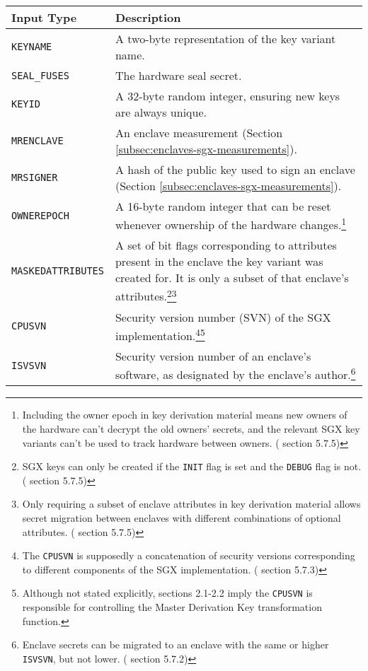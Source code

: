 \begin{tabularx}{\textwidth}{|l|X|}
\caption{Key Derivation Material}
\label{table:sgx-key-derivation-material}\\
\hline
    Input Type & Description \\
\hline\hline
    {\tt KEYNAME} & A two-byte representation of the key variant name. \\
\hline
    {\tt SEAL\_FUSES} & The hardware seal secret. \\
\hline
    {\tt KEYID} & A 32-byte random integer, ensuring new keys are always unique. \\
\hline
    {\tt MRENCLAVE} & An enclave measurement (Section \ref{subsec:enclaves-sgx-measurements}). \\
\hline
    {\tt MRSIGNER} & A hash of the public key used to sign an enclave (Section \ref{subsec:enclaves-sgx-measurements}). \\
\hline
    {\tt OWNEREPOCH} & A 16-byte random integer that can be reset whenever ownership of the hardware changes.\footnote{Including the owner epoch in key derivation material means new owners of the hardware can't decrypt the old owners' secrets, and the relevant SGX key variants can't be used to track hardware between owners. (\cite{intel-sgx-explained-advanced} section 5.7.5)} \\
\hline
    {\tt MASKEDATTRIBUTES} & A set of bit flags corresponding to attributes present in the enclave the key variant was created for. It is only a subset of that enclave's attributes.\footnote{SGX keys can only be created if the {\tt INIT} flag is set and the {\tt DEBUG} flag is not. (\cite{intel-sgx-explained-advanced} section 5.7.5)}\footnote{Only requiring a subset of enclave attributes in key derivation material allows secret migration between enclaves with different combinations of optional attributes. (\cite{intel-sgx-explained-advanced} section 5.7.5)} \\
\hline
    {\tt CPUSVN} & Security version number (SVN) of the SGX implementation.\footnote{The {\tt CPUSVN} is supposedly a concatenation of security versions corresponding to different components of the SGX implementation. (\cite{intel-sgx-explained-advanced} section 5.7.3)}\footnote{Although not stated explicitly, \cite{sgx-epid-provisioning-attestation} sections 2.1-2.2 imply the {\tt CPUSVN} is responsible for controlling the Master Derivation Key transformation function.} \\
\hline
    {\tt ISVSVN} & Security version number of an enclave's software, as designated by the enclave's author.\footnote{Enclave secrets can be migrated to an enclave with the same or higher {\tt ISVSVN}, but not lower. (\cite{intel-sgx-explained-advanced} section 5.7.2)} \\

\end{tabularx}
